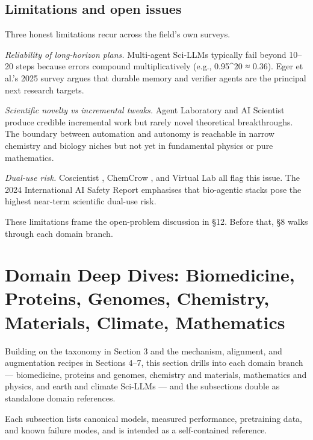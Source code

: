 \documentclass{article}
\begin{document}
\subsection{Limitations and open issues}\label{limitations-and-open-issues}

Three honest limitations recur across the field's own surveys.

\emph{Reliability of long-horizon plans.} Multi-agent Sci-LLMs typically fail beyond 10--20 steps because errors compound multiplicatively (e.g., 0.95\^{}20 ≈ 0.36). Eger et al.'s 2025 survey \cite{eger2025transformingscienc} argues that durable memory and verifier agents are the principal next research targets.

\emph{Scientific novelty vs incremental tweaks.} Agent Laboratory \cite{schmidgall2025agentlaboratoryusi} and AI Scientist produce credible incremental work but rarely novel theoretical breakthroughs. The boundary between automation and autonomy is reachable in narrow chemistry and biology niches but not yet in fundamental physics or pure mathematics.

\emph{Dual-use risk.} Coscientist \cite{boiko2023nature6242023}, ChemCrow \cite{bran2024naturemachineintel}, and Virtual Lab \cite{swanson2024thevirtuallabaiage} all flag this issue. The 2024 International AI Safety Report \cite{bengio2024internationalscien} emphasises that bio-agentic stacks pose the highest near-term scientific dual-use risk.

These limitations frame the open-problem discussion in §12. Before that, §8 walks through each domain branch.

\section{Domain Deep Dives: Biomedicine, Proteins, Genomes, Chemistry, Materials, Climate, Mathematics}\label{domain-deep-dives-biomedicine-proteins-genomes-chemistry-materials-climate-mathematics}

Building on the taxonomy in Section 3 and the mechanism, alignment, and augmentation recipes in Sections 4--7, this section drills into each domain branch --- biomedicine, proteins and genomes, chemistry and materials, mathematics and physics, and earth and climate Sci-LLMs --- and the subsections double as standalone domain references.

Each subsection lists canonical models, measured performance, pretraining data, and known failure modes, and is intended as a self-contained reference.
\end{document}

